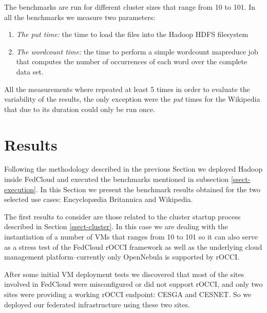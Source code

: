 \documentclass[oribibl]{llncs_Ibergrid2013}
\begin{document}
The benchmarks are run for different cluster sizes that range from 10 to 101. In all the benchmarks we measure two parameters:
\begin{enumerate}
\item \emph{The put time:} the time to load the files into the Hadoop HDFS filesystem 
\item \emph{The wordcount time:} the time to perform a simple wordcount mapreduce job that computes the number of occurrences of each word over the complete data set. 
\end{enumerate}
All the measurements where repeated at least 5 times in order to evaluate the variability of the results, the only exception were the \emph{put} times for the Wikipedia that due to its duration could only be run once.

\section{Results}
\label{sect-results}

Following the methodology described in the previous Section we deployed Hadoop inside FedCloud and executed the benchmarks mentioned in subsection \ref{ssect-execution}. In this Section we present the benchmark results obtained for the two selected use cases: Encyclop{\ae}dia Britannica and Wikipedia.

The first results to consider are those related to the cluster startup process described in Section \ref{ssect-cluster}. In this case we are dealing with the instantiation of a number of VMs that ranges from 10 to 101 so it can also serve as a stress test of the FedCloud rOCCI framework as well as the underlying cloud management platform--currently only OpenNebula is supported by rOCCI.


After some initial VM deployment tests we discovered that most of the sites involved in FedCloud were misconfigured or did not support rOCCI, and only two sites were providing a working rOCCI endpoint: CESGA and CESNET. So we deployed our federated infrastructure using these two sites.
\end{document}
